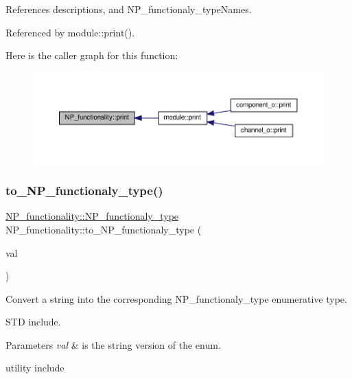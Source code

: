References descriptions, and N\+P\+\_\+functionaly\+\_\+type\+Names.



Referenced by module\+::print().

Here is the caller graph for this function\+:
\nopagebreak
\begin{figure}[H]
\begin{center}
\leavevmode
\includegraphics[width=350pt]{d8/dda/classNP__functionality_a2e17b1f41fd29d5929aeb464ac87f233_icgraph}
\end{center}
\end{figure}
\mbox{\label{classNP__functionality_a788fc254520907f4c8ef0d4182f7cc79}} 
\subsubsection{\texorpdfstring{to\+\_\+\+N\+P\+\_\+functionaly\+\_\+type()}{to\_NP\_functionaly\_type()}}
{\footnotesize\ttfamily \hyperlink{classNP__functionality_a318d6f254060bfdf145ebeb41efe772e}{N\+P\+\_\+functionality\+::\+N\+P\+\_\+functionaly\+\_\+type} N\+P\+\_\+functionality\+::to\+\_\+\+N\+P\+\_\+functionaly\+\_\+type (\begin{DoxyParamCaption}\item[{const std\+::string \&}]{val }\end{DoxyParamCaption})\hspace{0.3cm}{\ttfamily [private]}}



Convert a string into the corresponding N\+P\+\_\+functionaly\+\_\+type enumerative type. 

S\+TD include.


\begin{DoxyParams}{Parameters}
{\em val} & is the string version of the enum.\\
\hline
\end{DoxyParams}
utility include 

